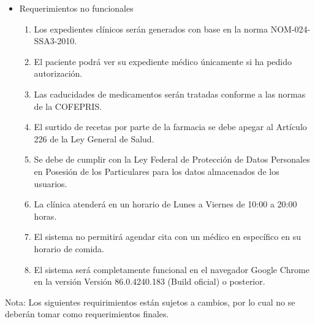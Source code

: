 \documentclass[12pt,letterpaper]{article}
\begin{document}
{{{\begin{itemize}
\begin{enumerate}
                        \item El sistema permitirá al encargado de farmacia modificar la existencia de medicamentos en inventario.
                    \end{enumerate}
                    \item Requerimientos no funcionales
                    \begin{enumerate}
                        \item Los expedientes clínicos serán generados con base en la norma NOM-024-SSA3-2010.
                        \item El paciente podrá ver su expediente médico únicamente si ha pedido autorización.
                        \item Las caducidades de medicamentos serán tratadas conforme a las normas de la COFEPRIS.
                        \item El surtido de recetas por parte de la farmacia se debe apegar al Artículo 226 de la Ley General de Salud.
                        \item Se debe de cumplir con la Ley Federal de Protección de Datos Personales en Posesión de los Particulares para los datos almacenados de los usuarios.
                        \item La clínica atenderá en un horario de Lunes a Viernes de 10:00 a 20:00 horas.
                        \item El sistema no permitirá agendar cita con un médico en específico en su horario de comida.
                        \item El sistema será completamente funcional en el navegador Google Chrome en la versión Versión 86.0.4240.183 (Build oficial) o posterior.
                    \end{enumerate}
            \end{itemize}
            Nota: Los siguientes requirimientos están sujetos a cambios, por lo cual no se deberán tomar como requerimientos finales.
			}
		}
	}
    \newpage
	\pagestyle{plain}
\end{document}
